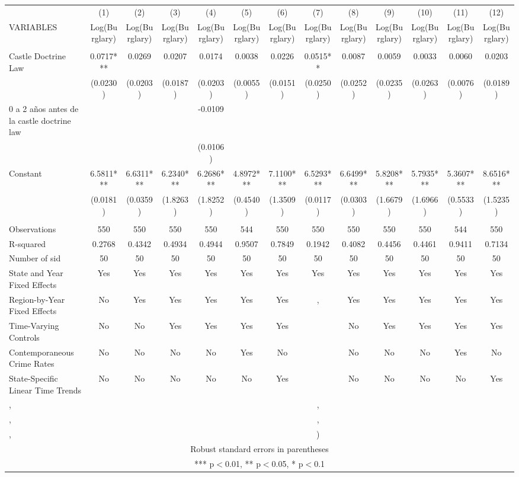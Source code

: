 \documentclass[]{article}
\begin{document}
\begin{tabular}{lcccccccccccc} \hline
 & (1) & (2) & (3) & (4) & (5) & (6) & (7) & (8) & (9) & (10) & (11) & (12) \\
VARIABLES & Log(Burglary) & Log(Burglary) & Log(Burglary) & Log(Burglary) & Log(Burglary) & Log(Burglary) & Log(Burglary) & Log(Burglary) & Log(Burglary) & Log(Burglary) & Log(Burglary) & Log(Burglary) \\ \hline
 &  &  &  &  &  &  &  &  &  &  &  &  \\
Castle Doctrine Law & 0.0717*** & 0.0269 & 0.0207 & 0.0174 & 0.0038 & 0.0226 & 0.0515** & 0.0087 & 0.0059 & 0.0033 & 0.0060 & 0.0203 \\
 & (0.0230) & (0.0203) & (0.0187) & (0.0203) & (0.0055) & (0.0151) & (0.0250) & (0.0252) & (0.0235) & (0.0263) & (0.0076) & (0.0189) \\
0 a 2 años antes de la castle doctrine law &  &  &  & -0.0109 &  &  &  &  &  &  &  &  \\
 &  &  &  & (0.0106) &  &  &  &  &  &  &  &  \\
Constant & 6.5811*** & 6.6311*** & 6.2340*** & 6.2686*** & 4.8972*** & 7.1100*** & 6.5293*** & 6.6499*** & 5.8208*** & 5.7935*** & 5.3607*** & 8.6516*** \\
 & (0.0181) & (0.0359) & (1.8263) & (1.8252) & (0.4540) & (1.3509) & (0.0117) & (0.0303) & (1.6679) & (1.6966) & (0.5533) & (1.5235) \\
 &  &  &  &  &  &  &  &  &  &  &  &  \\
Observations & 550 & 550 & 550 & 550 & 544 & 550 & 550 & 550 & 550 & 550 & 544 & 550 \\
R-squared & 0.2768 & 0.4342 & 0.4934 & 0.4944 & 0.9507 & 0.7849 & 0.1942 & 0.4082 & 0.4456 & 0.4461 & 0.9411 & 0.7134 \\
Number of sid & 50 & 50 & 50 & 50 & 50 & 50 & 50 & 50 & 50 & 50 & 50 & 50 \\
State and Year Fixed Effects & Yes & Yes & Yes & Yes & Yes & Yes & Yes & Yes & Yes & Yes & Yes & Yes \\
Region-by-Year Fixed Effects & No & Yes & Yes & Yes & Yes & Yes & , & Yes & Yes & Yes & Yes & Yes \\
Time-Varying Controls & No & No & Yes & Yes & Yes & Yes &  & No & Yes & Yes & Yes & Yes \\
Contemporaneous Crime Rates & No & No & No & No & Yes & No &  & No & No & No & Yes & No \\
State-Specific Linear Time Trends & No & No & No & No & No & Yes &  & No & No & No & No & Yes \\
, &  &  &  &  &  &  & , &  &  &  &  &  \\
, &  &  &  &  &  &  & , &  &  &  &  &  \\
 , &  &  &  &  &  &  & ) &  &  &  &  &  \\ \hline
\multicolumn{13}{c}{ Robust standard errors in parentheses} \\
\multicolumn{13}{c}{ *** p$<$0.01, ** p$<$0.05, * p$<$0.1} \\
\end{tabular}
\end{document}
